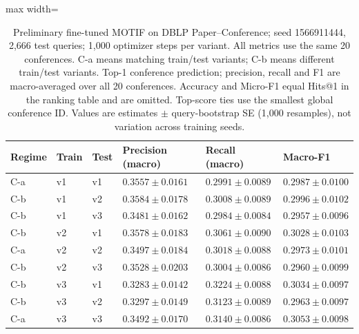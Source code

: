 \begin{table}[htbp]
\centering
\small
\renewcommand{\arraystretch}{1.15}
\setlength{\tabcolsep}{5pt}
\begin{adjustbox}{max width=\linewidth}
\begin{tabular}{|l|l|l|l|l|l|}
\hline
\textbf{Regime} & \textbf{Train} & \textbf{Test} & \textbf{Precision (macro)} & \textbf{Recall (macro)} & \textbf{Macro-F1} \\
\hline
C-a & v1 & v1 & $0.3557 \pm 0.0161$ & $0.2991 \pm 0.0089$ & $0.2987 \pm 0.0100$ \\
\hline
C-b & v1 & v2 & $0.3584 \pm 0.0178$ & $0.3008 \pm 0.0089$ & $0.2996 \pm 0.0102$ \\
\hline
C-b & v1 & v3 & $0.3481 \pm 0.0162$ & $0.2984 \pm 0.0084$ & $0.2957 \pm 0.0096$ \\
\hline
C-b & v2 & v1 & $0.3578 \pm 0.0183$ & $0.3061 \pm 0.0090$ & $0.3028 \pm 0.0103$ \\
\hline
C-a & v2 & v2 & $0.3497 \pm 0.0184$ & $0.3018 \pm 0.0088$ & $0.2973 \pm 0.0101$ \\
\hline
C-b & v2 & v3 & $0.3528 \pm 0.0203$ & $0.3004 \pm 0.0086$ & $0.2960 \pm 0.0099$ \\
\hline
C-b & v3 & v1 & $0.3283 \pm 0.0142$ & $0.3224 \pm 0.0088$ & $0.3034 \pm 0.0097$ \\
\hline
C-b & v3 & v2 & $0.3297 \pm 0.0149$ & $0.3123 \pm 0.0089$ & $0.2963 \pm 0.0097$ \\
\hline
C-a & v3 & v3 & $0.3492 \pm 0.0170$ & $0.3140 \pm 0.0086$ & $0.3053 \pm 0.0098$ \\
\hline
\end{tabular}
\end{adjustbox}
\caption{Preliminary fine-tuned MOTIF on DBLP Paper--Conference; seed 1566911444, 2,666 test queries; 1,000 optimizer steps per variant. All metrics use the same 20 conferences. C-a means matching train/test variants; C-b means different train/test variants. Top-1 conference prediction; precision, recall and F1 are macro-averaged over all 20 conferences. Accuracy and Micro-F1 equal Hits@1 in the ranking table and are omitted. Top-score ties use the smallest global conference ID. Values are estimates $\pm$ query-bootstrap SE (1,000 resamples), not variation across training seeds.}
\label{tab:motif-dblp-matrix-conference-prediction}
\end{table}
